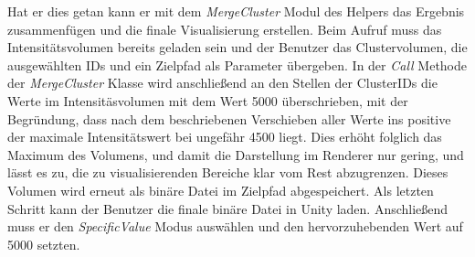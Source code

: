 Hat er dies getan kann er mit dem \textit{MergeCluster} Modul des Helpers das Ergebnis zusammenfügen und die finale Visualisierung erstellen.
\newline
Beim Aufruf muss das Intensitätsvolumen bereits geladen sein und der Benutzer das Clustervolumen, die ausgewählten IDs und ein Zielpfad als Parameter übergeben.
\newline
In der \textit{Call} Methode der \textit{MergeCluster} Klasse wird anschließend an den Stellen der ClusterIDs die Werte im Intensitäsvolumen mit dem Wert 5000 überschrieben, mit der Begründung, dass nach dem beschriebenen Verschieben aller Werte ins positive der maximale Intensitätswert bei ungefähr 4500 liegt. Dies erhöht folglich das Maximum des Volumens, und damit die Darstellung im Renderer nur gering, und lässt es zu, die zu visualisierenden Bereiche klar vom Rest abzugrenzen. Dieses Volumen wird erneut als binäre Datei im Zielpfad abgespeichert.
\newline
Als letzten Schritt kann der Benutzer die finale binäre Datei in Unity laden. Anschließend muss er den \textit{SpecificValue} Modus auswählen und den hervorzuhebenden Wert auf 5000 setzten.













































